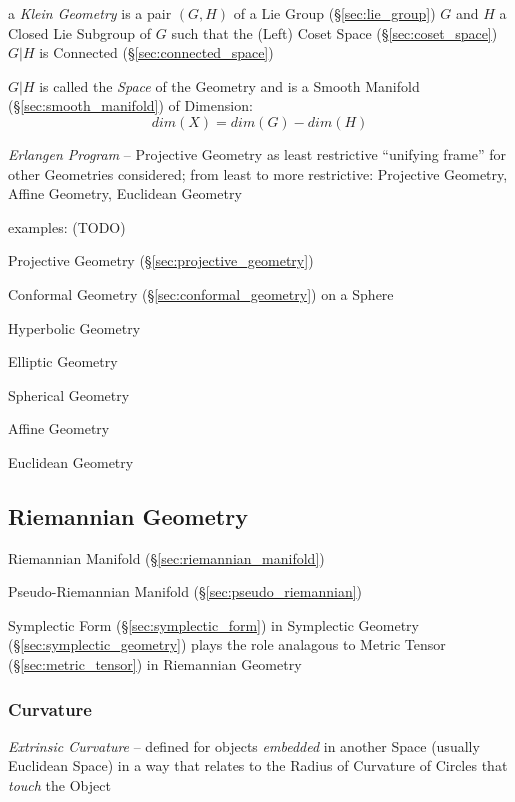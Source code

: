a \emph{Klein Geometry} is a pair $(G,H)$ of a Lie Group
(\S\ref{sec:lie_group}) $G$ and $H$ a Closed Lie Subgroup of $G$ such
that the (Left) Coset Space (\S\ref{sec:coset_space}) $G|H$ is
Connected (\S\ref{sec:connected_space})

$G|H$ is called the \emph{Space} of the Geometry and is a Smooth
Manifold (\S\ref{sec:smooth_manifold}) of Dimension:
\[
  dim(X) = dim(G) - dim(H)
\]

\emph{Erlangen Program} -- Projective Geometry as least restrictive
``unifying frame'' for other Geometries considered; from least to more
restrictive: Projective Geometry, Affine Geometry, Euclidean Geometry

examples: (TODO)

Projective Geometry (\S\ref{sec:projective_geometry})

Conformal Geometry (\S\ref{sec:conformal_geometry}) on a Sphere

Hyperbolic Geometry

Elliptic Geometry

Spherical Geometry

Affine Geometry

Euclidean Geometry



\subsection{Riemannian Geometry}\label{sec:riemannian_geometry}

Riemannian Manifold (\S\ref{sec:riemannian_manifold})

Pseudo-Riemannian Manifold (\S\ref{sec:pseudo_riemannian})

Symplectic Form (\S\ref{sec:symplectic_form}) in Symplectic Geometry
(\S\ref{sec:symplectic_geometry}) plays the role analagous to Metric Tensor
(\S\ref{sec:metric_tensor}) in Riemannian Geometry



\subsubsection{Curvature}\label{sec:reimannian_curvature}


\emph{Extrinsic Curvature} -- defined for objects \emph{embedded} in another
Space (usually Euclidean Space) in a way that relates to the Radius of
Curvature of Circles that \emph{touch} the Object

